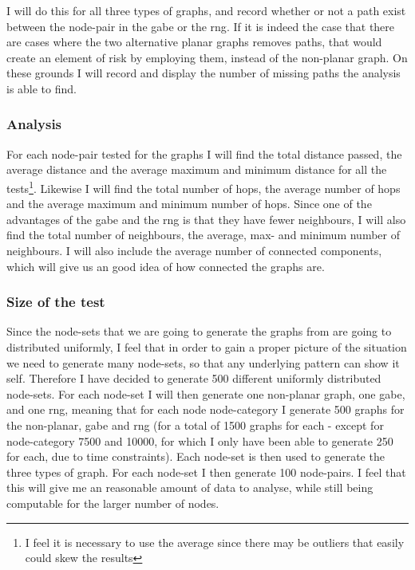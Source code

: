 I will do this for all three types of graphs, and record whether or not a path exist between the node-pair in the \ac{gabe} or the \ac{rng}. If it is indeed the case that there are cases where the two alternative planar graphs removes paths, that would create an element of risk by employing them, instead of the non-planar graph. On these grounds I will record and display the number of missing paths the analysis is able to find.

\subsubsection{Analysis}
For each node-pair tested for the graphs I will find the total distance passed, the average distance and the average maximum and minimum distance for all the tests\footnote{I feel it is necessary to use the average since there may be outliers that easily could skew the results}. Likewise I will find the total number of hops, the average number of hops and the average maximum and minimum number of hops. Since one of the advantages of the \ac{gabe} and the \ac{rng} is that they have fewer neighbours, I will also find the total number of neighbours, the average, max- and minimum number of neighbours. I will also include the average number of connected components, which will give us an good idea of how connected the graphs are.

\subsubsection{Size of the test}
Since the node-sets that we are going to generate the graphs from are going to distributed uniformly, I feel that in order to gain a proper picture of the situation we need to generate many node-sets, so that any underlying pattern can show it self. Therefore I have decided to generate 500 different uniformly distributed node-sets. For each node-set I will then generate one non-planar graph, one \ac{gabe}, and one \ac{rng}, meaning that for each node node-category I  generate 500 graphs for the non-planar, \ac{gabe} and \ac{rng} (for a total of 1500 graphs for each - except for node-category 7500 and 10000, for which I only have been able to generate 250 for each, due to time constraints). Each node-set is then used to generate the three types of graph. For each node-set I then generate 100 node-pairs. I feel that this will give me an reasonable amount of data to analyse, while still being computable for the larger number of nodes.



